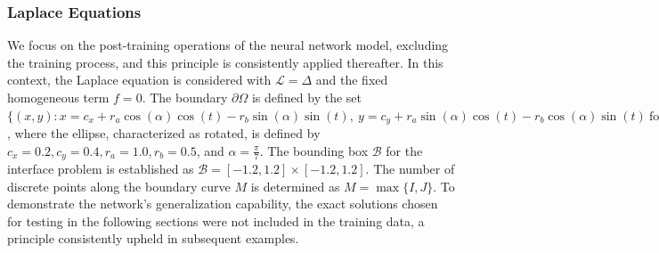 \documentclass{article}
\begin{document}
\subsubsection{Laplace Equations} \label{Laplace Equations}
We focus on the post-training operations of the neural network model, excluding the training process, and this principle is consistently applied thereafter. In this context, the Laplace equation is considered with $\mathcal{L} = \Delta$ and the fixed homogeneous term $f = 0$. The boundary $\partial \Omega$ is defined by the set $\{(x, y): x = c_x + r_a \cos(\alpha) \cos(t) - r_b \sin(\alpha) \sin(t),\ y = c_y + r_a \sin(\alpha) \cos(t) - r_b \cos(\alpha) \sin(t)\ \mbox{for}\ t \in [0, 2\pi)\}$, where the ellipse, characterized as rotated, is defined by $c_x = 0.2, c_y = 0.4, r_a = 1.0, r_b = 0.5$, and $\alpha = \frac{\pi}{7}$. The bounding box $\mathcal{B}$ for the interface problem is established as $\mathcal{B} = [-1.2,1.2] \times [-1.2,1.2]$. The number of discrete points along the boundary curve $M$ is determined as $M = \max\{I, J\}$. To demonstrate the network's generalization capability, the exact solutions chosen for testing in the following sections were not included in the training data, a principle consistently upheld in subsequent examples.
\end{document}
